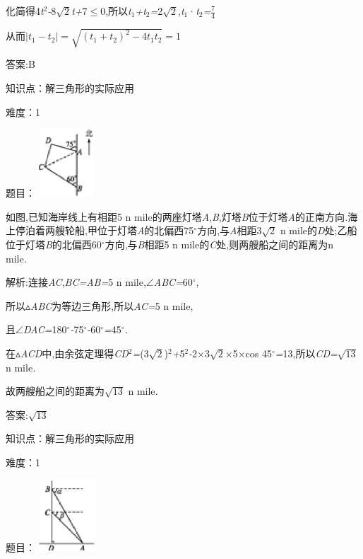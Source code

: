 \documentclass{article} %
\begin{document}
化简得4\textit{t}${}^{2}$\textit{-}8$\sqrt{2}$\textit{t+}7$\mathrm{\le}$0,所以\textit{t}${}_{1}$\textit{+t}${}_{2}$\textit{=}2$\sqrt{2}$,\textit{t}${}_{1}$·\textit{t}${}_{2}$\textit{=}$\frac{7}{4}$

从而$|t_1-t_2|=\sqrt{{(t_1+t_2)}^2-4t_1t_2}=1$

 答案:B

知识点：解三角形的实际应用

难度：1

题目： 
\includegraphics*[width=0.82in, height=1.00in, keepaspectratio=false]{image1105}

 如图,已知海岸线上有相距5 n mile的两座灯塔\textit{A},\textit{B},灯塔\textit{B}位于灯塔\textit{A}的正南方向\textit{.}海上停泊着两艘轮船,甲位于灯塔\textit{A}的北偏西75$\mathrm{{}^\circ}$方向,与\textit{A}相距3$\sqrt{2}$ n mile的\textit{D}处;乙船位于灯塔\textit{B}的北偏西60$\mathrm{{}^\circ}$方向,与\textit{B}相距5 n mile的\textit{C}处,则两艘船之间的距离为\textit{\underbar{　　　　　}}n mile\textit{.~}

 解析:连接\textit{AC},\textit{BC=AB=}5 n mile,$\mathrm{\angle}$\textit{ABC=}60$\mathrm{{}^\circ}$,

所以$\mathrm{\vartriangle}$\textit{ABC}为等边三角形,所以\textit{AC=}5 n mile,

且$\mathrm{\angle}$\textit{DAC=}180$\mathrm{{}^\circ}$\textit{-}75$\mathrm{{}^\circ}$\textit{-}60$\mathrm{{}^\circ}$\textit{=}45$\mathrm{{}^\circ}$\textit{.}

在$\mathrm{\vartriangle}$\textit{ACD}中,由余弦定理得\textit{CD}${}^{2}$\textit{=}(3$\sqrt{2}$)${}^{2}$\textit{+}5${}^{2}$\textit{-}2\textit{$\times$}3$\sqrt{2}$\textit{$\times$}5\textit{$\times$}cos 45$\mathrm{{}^\circ}$\textit{=}13,所以\textit{CD=}$\sqrt{13}$ n mile\textit{.}

故两艘船之间的距离为$\sqrt{13}$ n mile\textit{.}

 答案:$\sqrt{13}$

知识点：解三角形的实际应用

难度：1

题目：
\includegraphics*[width=0.85in, height=1.06in, keepaspectratio=false]{image1112}
\end{document}

